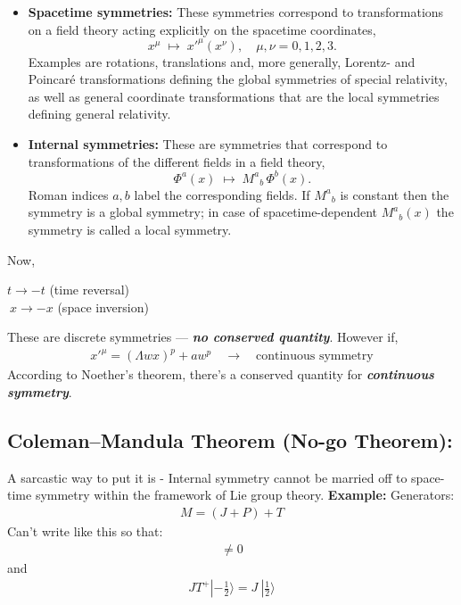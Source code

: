 \documentclass[14pt]{article} %
\begin{document}
\begin{itemize}
  \item \textbf{Spacetime symmetries:} These symmetries correspond to transformations on a field theory 
  acting explicitly on the spacetime coordinates,
  \[
    x^\mu \;\mapsto\; x'^\mu(x^\nu), \quad \mu, \nu = 0,1,2,3 .
  \]
  Examples are rotations, translations and, more generally, Lorentz- and Poincar\'e transformations 
  defining the global symmetries of special relativity, as well as general coordinate transformations 
  that are the local symmetries defining general relativity.

  \item \textbf{Internal symmetries:} These are symmetries that correspond to transformations of the 
  different fields in a field theory,
  \[
    \Phi^a(x) \;\mapsto\; M^a{}_b \, \Phi^b(x) .
  \]
  Roman indices $a, b$ label the corresponding fields. If $M^a{}_b$ is constant then the symmetry 
  is a global symmetry; in case of spacetime-dependent $M^a{}_b(x)$ the symmetry is called a local symmetry.
\end{itemize}
Now,
\vspace{-0.5cm}
\begin{center}
    $t \rightarrow -t$ \quad (time reversal) \\
    $~x \rightarrow -x$ \quad (space inversion)
\end{center}
These are discrete symmetries — \textbf{\textit{no conserved quantity}}. However if,
\begin{align*}
x'^\mu = (\Lambda wx)^p + aw^p \quad \to \quad \text{continuous symmetry}
\end{align*}
According to Noether’s theorem, there's a conserved quantity for \textbf{\textit{continuous symmetry}}.

\begin{tcolorbox}[ title=Notes]
\subsection*{Coleman–Mandula Theorem (No-go Theorem):}
A sarcastic way to put it is - Internal symmetry cannot be married off to space-time symmetry within the framework of Lie group theory. \textbf{Example:} Generators:
\begin{align*}
M = (J + P) + T
\end{align*}
Can't write like this so that:
\begin{align*}
[J, T] \ne 0
\end{align*}
and
\begin{align*}
JT^+ |-\frac{1}{2} \rangle = J~ |\frac{1}{2} \rangle
\end{align*}
\end{tcolorbox}
\end{document}
